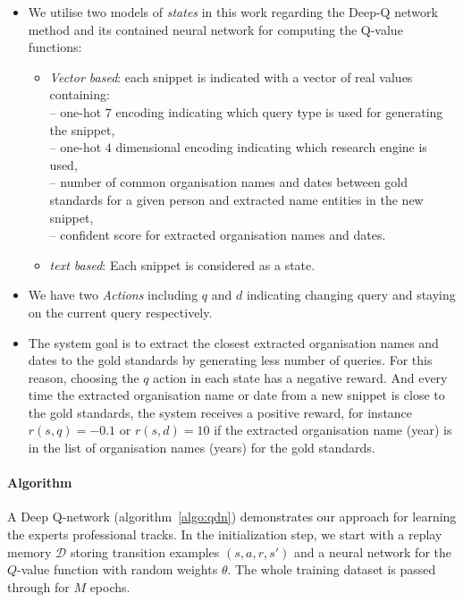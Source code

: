 \begin{itemize}
	\item %
	 We utilise two models of \textit{states} in this work regarding the Deep-Q network method and its contained neural network for computing the Q-value functions:
	\begin{itemize}
		\item \textit{Vector based}: each snippet is indicated with a vector of real values containing: \\
		-- one-hot $7$ encoding indicating which query type is used for generating the snippet,\\
	    -- one-hot $4$ dimensional encoding indicating which research engine is used, \\
		-- number of common organisation names and dates between gold standards for a given person and extracted name entities in the new snippet,\\
        -- confident score for extracted organisation names and dates. 
		\item \textit{text based}: Each snippet is considered as a state.
	\end{itemize}
	\item We have two \textit{Actions} including $q$ and $d$ indicating changing query and staying on the current query respectively. 
	\item The system goal is to extract the closest extracted organisation names and dates to the gold standards by generating less number of queries. For this reason, choosing the $q$ action in each state has a negative reward. And every time the extracted organisation name or date from a new snippet is close to the gold standards, the system receives a positive reward, for instance $r(s, q) = -0.1$ or $r(s, d) = 10$ if the extracted organisation name (year) is in the list of organisation names (years) for the gold standards. 
\end{itemize}

\paragraph{Algorithm}
A Deep Q-network (algorithm~\ref{algo:qdn}) demonstrates our approach for learning the experts professional tracks. 
In the initialization step, we start with a replay memory $\mathcal{D}$ storing transition examples $(s, a, r, s' )$ and a neural network for the $Q$-value function with random weights $\theta$. The whole training dataset is passed through for $M$ epochs. 

